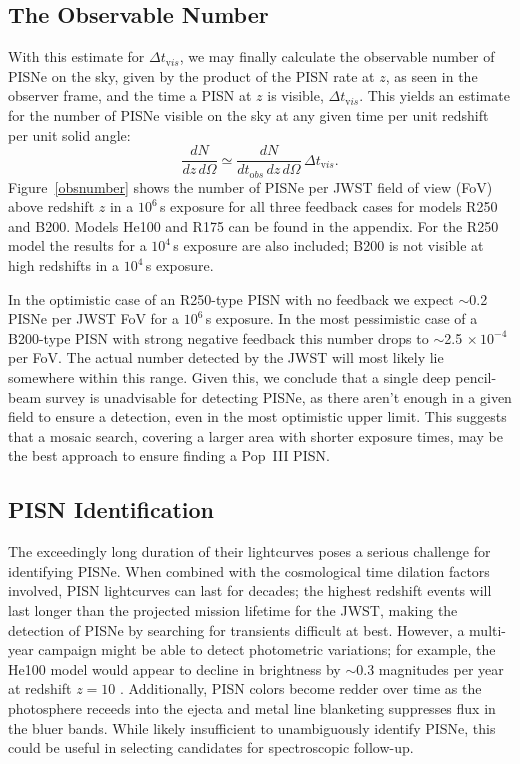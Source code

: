 \documentclass{thesis}
\newcommand{\about}{\ensuremath{\sim}}
\newcommand{\RefFig}[1]{\mbox{Figure~\ref{#1}}}
\begin{document}
\subsection{The Observable Number}
 With this estimate for $\Delta t_{\mathrm vis}$, we may finally calculate
 the observable number of PISNe on the sky, given by the product of
 the PISN rate at $z$, as seen in the observer frame, and the time a
 PISN at $z$ is visible, $\Delta t_{\mathrm vis}$. This yields an estimate
 for the number of PISNe visible on the sky at any given time per unit
 redshift per unit solid angle:
\begin{equation} 
\frac{dN}{dz\,d\Omega} \simeq \frac{dN}{dt_{\mathrm
    obs}\,dz\,d\Omega}\,\Delta t_{\mathrm vis}.
\end{equation}
\RefFig{obsnumber} shows the number of PISNe per JWST field of view
(FoV) above redshift $z$ in a $10^6\,$s exposure for all three
feedback cases for models R250 and B200. Models He100 and R175 can be
found in the appendix.  For the R250 model the results for a $10^4\,$s
exposure are also included; B200 is not visible at high redshifts in a
$10^4\,$s exposure.

In the optimistic case of an R250-type PISN with no feedback we expect
\about0.2 PISNe per JWST FoV for a $10^6\,$s exposure.  In the most
pessimistic case of a B200-type PISN with strong negative feedback
this number drops to \about2.5$\,\times10^{-4}$ per FoV.  The actual
number detected by the JWST will most likely lie somewhere within this
range. Given this, we conclude that a single deep pencil-beam survey
is unadvisable for detecting PISNe, as there aren't enough in a given
field to ensure a detection, even in the most optimistic upper limit.
This suggests that a mosaic search, covering a larger area with shorter
exposure times, may be the best approach to ensure finding a Pop~III
PISN.

\subsection{PISN Identification}
The exceedingly long duration of their lightcurves poses a serious
challenge for identifying PISNe.  When combined with the cosmological
time dilation factors involved, PISN lightcurves can last for decades;
the highest redshift events will last longer than the projected
mission lifetime for the JWST, making the detection of PISNe by
searching for transients difficult at best.  However, a multi-year
campaign might be able to detect photometric variations; for example,
the He100 model would appear to decline in brightness by \about0.3
magnitudes per year at redshift $z=10$
\citep{KasenWoosleyHeger2011}. Additionally, PISN colors become redder
over time as the photosphere receeds into the ejecta and metal line
blanketing suppresses flux in the bluer bands.  While likely
insufficient to unambiguously identify PISNe, this could be useful in
selecting candidates for spectroscopic follow-up.
\end{document}
